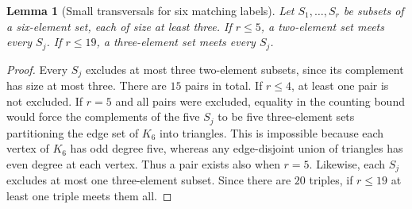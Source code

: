 \documentclass[11pt]{article}
\newtheorem{lemma}[theorem]{Lemma}
\begin{document}
\begin{lemma}[Small transversals for six matching labels]\label{lem:hit}
Let $S_1,\ldots,S_r$ be subsets of a six-element set, each of
size at least three. If $r\le5$, a two-element set meets every
$S_j$. If $r\le19$, a three-element set meets every $S_j$.
\end{lemma}
\begin{proof}
Every $S_j$ excludes at most three two-element subsets, since
its complement has size at most three. There are $15$ pairs in
total. If $r\le4$, at least one pair is not excluded. If $r=5$
and all pairs were excluded, equality in the counting bound
would force the complements of the five $S_j$ to be five
three-element sets partitioning the edge set of $K_6$ into
triangles. This is impossible because each vertex of $K_6$
has odd degree five, whereas any edge-disjoint union of
triangles has even degree at each vertex. Thus a pair exists
also when $r=5$. Likewise, each $S_j$ excludes at most
one three-element subset. Since there are $20$ triples, if
$r\le19$ at least one triple meets them all.
\end{proof}
\end{document}
